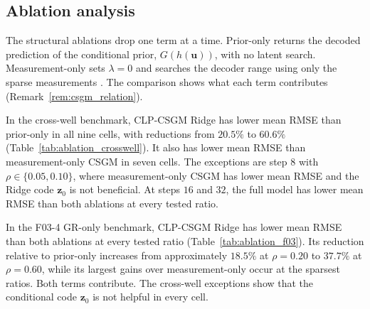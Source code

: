\subsection{Ablation analysis}
\label{subsec:ablation_analysis}

The structural ablations drop one term at a time.
Prior-only returns the decoded prediction of the conditional prior,
$G(h(\boldsymbol{u}))$, with no latent search. Measurement-only
sets $\lambda=0$ and searches the decoder range using only the sparse
measurements \citep{bora2017compressed}. The comparison shows what each
term contributes
(Remark~\ref{rem:csgm_relation}).

In the cross-well benchmark, CLP-CSGM Ridge has lower mean RMSE than prior-only
in all nine cells, with reductions from $20.5\%$ to $60.6\%$
(Table~\ref{tab:ablation_crosswell}). It also has lower mean RMSE than
measurement-only CSGM in seven cells. The exceptions are step $8$ with
$\rho\in\{0.05,0.10\}$, where measurement-only CSGM has lower mean RMSE and the
Ridge code $\boldsymbol{z}_0$ is not beneficial. At steps $16$ and $32$, the full model has
lower mean RMSE than both ablations at every tested ratio.

\begin{table}[t]
    \centering
    \caption{Cross-well $V_c$ ablation results. Gains are relative RMSE
    reductions of CLP-CSGM Ridge with respect to the corresponding structural
    ablation; negative gain indicates that measurement-only CSGM has lower mean
    RMSE.}
    \label{tab:ablation_crosswell}
    \small
\end{table}

In the F03-4 GR-only benchmark, CLP-CSGM Ridge has lower mean RMSE than both
ablations at every tested ratio (Table~\ref{tab:ablation_f03}). Its reduction
relative to prior-only
increases from approximately $18.5\%$ at $\rho=0.20$ to $37.7\%$ at
$\rho=0.60$, while its largest gains over measurement-only occur at the
sparsest ratios. Both terms contribute. The cross-well exceptions show that
the conditional code $\boldsymbol{z}_0$ is not helpful in every cell.

\begin{table}[t]
    \centering
    \caption{Single-well F03-4 GR-only ablation results. Gains are relative
    RMSE reductions of CLP-CSGM Ridge with respect to the corresponding
    structural ablation.}
    \label{tab:ablation_f03}
    \small
\end{table}

